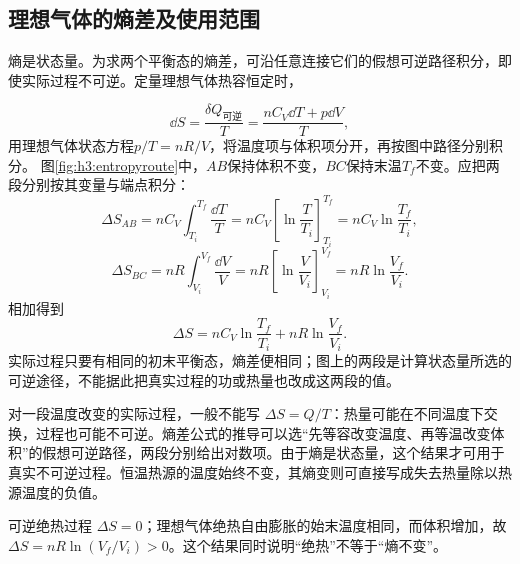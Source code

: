 \subsection{理想气体的熵差及使用范围}
熵是状态量。为求两个平衡态的熵差，可沿任意连接它们的假想可逆路径积分，即使实际过程不可逆。定量理想气体热容恒定时，

\[\dd S=\frac{\delta Q_{\text{可逆}}}T=\frac{nC_V\dd T+p\dd V}{T},
\]
用理想气体状态方程$p/T=nR/V$，将温度项与体积项分开，再按图中路径分别积分。
图\ref{fig:h3:entropyroute}中，$AB$保持体积不变，$BC$保持末温$T_f$不变。应把两段分别按其变量与端点积分：
\[
\Delta S_{AB}=nC_V\int_{T_i}^{T_f}\frac{\dd T}{T}
=nC_V\left[\ln\frac T{T_i}\right]_{T_i}^{T_f}
=nC_V\ln\frac{T_f}{T_i},
\]
\[
\Delta S_{BC}=nR\int_{V_i}^{V_f}\frac{\dd V}{V}
=nR\left[\ln\frac V{V_i}\right]_{V_i}^{V_f}
=nR\ln\frac{V_f}{V_i}.
\]
相加得到
\[
\boxed{\Delta S=nC_V\ln\frac{T_f}{T_i}+nR\ln\frac{V_f}{V_i}}.
\]实际过程只要有相同的初末平衡态，熵差便相同；图上的两段是计算状态量所选的可逆途径，不能据此把真实过程的功或热量也改成这两段的值。



对一段温度改变的实际过程，一般不能写 $\Delta S=Q/T$：热量可能在不同温度下交换，过程也可能不可逆。熵差公式的推导可以选“先等容改变温度、再等温改变体积”的假想可逆路径，两段分别给出对数项。由于熵是状态量，这个结果才可用于真实不可逆过程。恒温热源的温度始终不变，其熵变则可直接写成失去热量除以热源温度的负值。

可逆绝热过程 $\Delta S=0$；理想气体绝热自由膨胀的始末温度相同，而体积增加，故 $\Delta S=nR\ln(V_f/V_i)>0$。这个结果同时说明“绝热”不等于“熵不变”。

